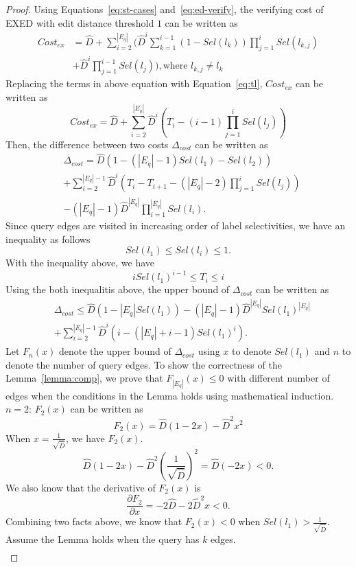 \documentclass{sigmod}
\newcommand{\basis}{\newline \noindent {\bf Basis:} }
\newcommand{\ih}{\newline \noindent {\bf Induction hypothesis:}  Assume }
\begin{document}
\begin{proof}
Using Equations~\ref{eq:st-cases} and~\ref{eq:ed-verify}, the verifying cost of EXED with edit distance threshold $1$ can be written as 
\begin{align*}
Cost_{ex}&=\hat{D} + \sum_{i=2}^{|E_q|}(\hat{D}^{i}\sum_{k=1}^{i-1} (1 - Sel(l_k))\prod_{j=1}^{i}Sel(l_{k,j})\\
&+ \hat{D}^{i}\prod_{j=1}^{i-1}Sel(l_j)), \text{where } l_{k,j} \not= l_k
\end{align*}
Replacing the terms in above equation with Equation~\ref{eq:tl}, $Cost_{ex}$ can be written as
\[
Cost_{ex}=\hat{D} + \sum_{i=2}^{|E_q|}\hat{D}^{i}(T_{i} - (i-1)\prod_{j=1}^{i}Sel(l_j))
\] 
Then, the difference between two costs $\Delta_{cost}$ can be written as
\begin{align*}
&\Delta_{cost} = \hat{D}(1 - (|E_q| - 1)Sel(l_1) - Sel(l_2)) \\
&+ \sum_{i=2}^{|E_q| - 1}\hat{D}^i(T_i - T_{i+1} -  (|E_q| - 2)\prod_{j=1}^i Sel(l_j))\\
&- (|E_q| - 1)\hat{D}^{|E_q|}\prod_{i=1}^{|E_q|}Sel(l_i).
\end{align*}
Since query edges are visited in increasing order of label selectivities, we have an inequality as follows
\[
Sel(l_1) \leq Sel(l_i) \leq 1.
\]
With the inequality above, we have 
\[
iSel(l_1)^{i-1}\leq T_i \leq i
\]
Using the both inequalitis above, the upper bound of $\Delta_{cost}$ can be written as
\begin{align*}
&\Delta_{cost} \leq \hat{D}(1 - {|E_q|}Sel(l_1)) - (|E_q| - 1)\hat{D}^{|E_q|}Sel(l_1)^{|E_q|}\\
&+ \sum_{i=2}^{|E_q| - 1}\hat{D}^i(i -(|E_q| + i - 1) Sel(l_1)^i).
\end{align*}
Let $F_n(x)$ denote the upper bound of $\Delta_{cost}$ using $x$ to denote $Sel(l_1)$ and $n$ to denote the number of query edges. To show the correctness of the Lemma~\ref{lemma:comp}, we prove that $F_{|E_q|}(x) \leq 0$ with different number of edges when the conditions in the Lemma holds using mathematical induction.
\basis
$n = 2$: $F_2(x)$ can be written as 
\[
F_2(x) = \hat{D}(1 - 2x) - \hat{D}^2x^2
\]
When $x = \frac{1}{\sqrt{\hat{D}}}$, we have $F_2(x)$.
\[
\hat{D}(1 - 2x) - \hat{D}^2(\frac{1}{\sqrt{\hat{D}}})^2 = \hat{D}(-2x)<0.
\]
We also know that the derivative of $F_2(x)$ is
\[
\frac{\partial F_2}{\partial x} = -2\hat{D} - 2\hat{D}^2x < 0.
\]
Combining two facts above, we know that $F_2(x) < 0$ when $Sel(l_1) > \frac{1}{\sqrt{\hat{D}}}$.
\ih
the Lemma holds when the query has $k$ edges.
\begin{align*}

\end{align*}
\end{proof}
\end{document}
